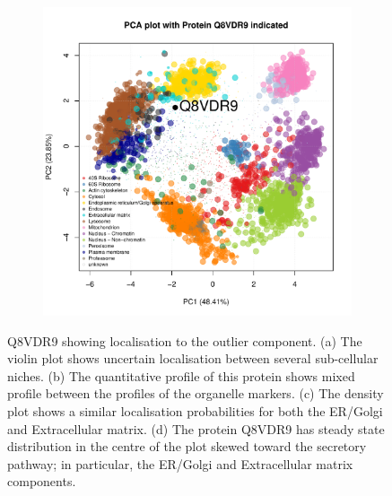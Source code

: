 \documentclass[12pt,english]{article}\usepackage[]{graphicx}\usepackage[]{color}
\makeatletter
\def\maxwidth{ %
  \ifdim\Gin@nat@width>\linewidth
    \linewidth
  \else
    \Gin@nat@width
  \fi
}
\newenvironment{knitrout}{}{} %
\makeatother
\begin{document}
\begin{figure}[p]
\begin{subfigure}[t]{0.5\textwidth}
\begin{knitrout}
{}



\end{knitrout}
    \caption{}
  \end{subfigure}%
  \begin{subfigure}[t]{0.5\textwidth}
    \centering
\begin{knitrout}
\color{fgcolor}

{\centering \includegraphics[width=\maxwidth]{figure/Q8VDR9-pca-1} 

}



\end{knitrout}
    \caption{}
  \end{subfigure}

  \caption{Q8VDR9 showing localisation to the outlier component.  (a)
    The violin plot shows uncertain localisation between several
    sub-cellular niches. (b) The quantitative profile of this protein
    shows mixed profile between the profiles of the organelle
    markers. (c) The density plot shows a similar localisation
    probabilities for both the ER/Golgi and Extracellular matrix. (d)
    The protein Q8VDR9 has steady state distribution in the centre of
    the plot skewed toward the secretory pathway; in particular, the
    ER/Golgi and Extracellular matrix components.}
  \label{fig:Q8VDR9}
\end{figure}
\end{document}
